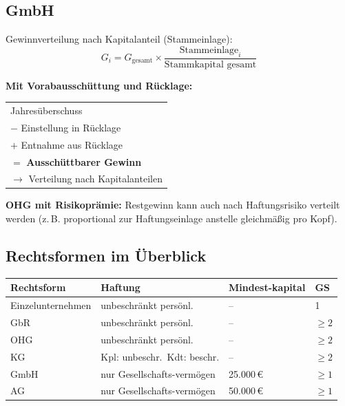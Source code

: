 \documentclass[10pt,a4paper]{article}
\begin{document}
\begin{multicols}{2}
\columnbreak

\subsection{GmbH}

\begin{formelbox}
Gewinnverteilung nach Kapitalanteil (Stammeinlage):
\[
G_i = G_{\text{gesamt}} \times \frac{\text{Stammeinlage}_i}{\text{Stammkapital gesamt}}
\]
\end{formelbox}

\textbf{Mit Vorabausschüttung und Rücklage:}
\begin{formelbox}
\renewcommand{\arraystretch}{1.1}
\begin{tabular}{@{}l@{}}
Jahresüberschuss \\
$-$ Einstellung in Rücklage \\
$+$ Entnahme aus Rücklage \\
\hline
$=$ \textbf{Ausschüttbarer Gewinn} \\
$\to$ Verteilung nach Kapitalanteilen \\
\end{tabular}
\end{formelbox}

\textbf{OHG mit Risikoprämie:} Restgewinn kann auch nach Haftungsrisiko verteilt werden (z.\,B. proportional zur Haftungseinlage anstelle gleichmäßig pro Kopf).

\subsection{Rechtsformen im Überblick}

\begin{tabular}{|L{2.3cm}|L{2.5cm}|L{1.5cm}|L{0.8cm}|}
\hline
{}
\textbf{Rechtsform} & \textbf{Haftung} & \textbf{Mindest-kapital} & \textbf{GS} \\
\hline
Einzel\-unter\-nehmen & unbeschränkt persönl. & -- & 1 \\
\hline
GbR & unbeschränkt persönl. & -- & $\geq\!2$ \\
\hline
OHG & unbeschränkt persönl. & -- & $\geq\!2$ \\
\hline
KG & Kpl: unbeschr.\ Kdt: beschr. & -- & $\geq\!2$ \\
\hline
GmbH & nur Gesellschafts-vermögen & 25.000\,€ & $\geq\!1$ \\
\hline
AG & nur Gesellschafts-vermögen & 50.000\,€ & $\geq\!1$ \\
\hline
\end{tabular}


\end{multicols}
\end{document}
